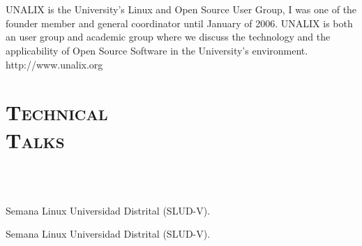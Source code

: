 \begin{resume}
\begin{formatb}
  \\
   
  \body\\
\end{formatb}

\begin{position}
UNALIX is the University's Linux and Open Source User Group, I was one
of the founder member  and general coordinator until January of
2006. UNALIX is both an user group and academic group where we
discuss the technology and the applicability of Open Source Software
in the University's environment. http://www.unalix.org
\end{position}



\section{\textsc{Technical \\ Talks}}

\begin{formatb}
  \\
  \\
   \body
\end{formatb}

\begin{position}
Semana Linux Universidad Distrital (SLUD-V).
\end{position}

\begin{position}
Semana Linux Universidad Distrital (SLUD-V).
\end{position}


\end{resume}
